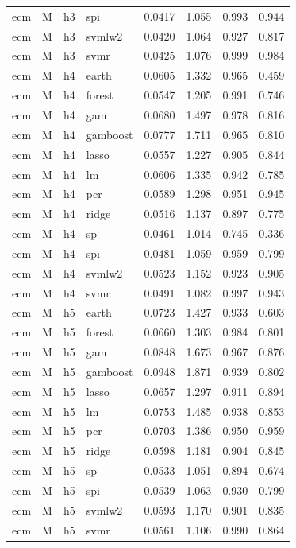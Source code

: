 \begin{ThreePartTable}
\begin{longtable}[t]{llclcccc}
ecm & M & h3 & spi & 0.0417 & 1.055 & 0.993 & 0.944\\
ecm & M & h3 & svmlw2 & 0.0420 & 1.064 & 0.927 & 0.817\\
ecm & M & h3 & svmr & 0.0425 & 1.076 & 0.999 & 0.984\\
\addlinespace
ecm & M & h4 & earth & 0.0605 & 1.332 & 0.965 & 0.459\\
ecm & M & h4 & forest & 0.0547 & 1.205 & 0.991 & 0.746\\
ecm & M & h4 & gam & 0.0680 & 1.497 & 0.978 & 0.816\\
ecm & M & h4 & gamboost & 0.0777 & 1.711 & 0.965 & 0.810\\
ecm & M & h4 & lasso & 0.0557 & 1.227 & 0.905 & 0.844\\
ecm & M & h4 & lm & 0.0606 & 1.335 & 0.942 & 0.785\\
ecm & M & h4 & pcr & 0.0589 & 1.298 & 0.951 & 0.945\\
ecm & M & h4 & ridge & 0.0516 & 1.137 & 0.897 & 0.775\\
ecm & M & h4 & sp & 0.0461 & 1.014 & 0.745 & 0.336\\
ecm & M & h4 & spi & 0.0481 & 1.059 & 0.959 & 0.799\\
ecm & M & h4 & svmlw2 & 0.0523 & 1.152 & 0.923 & 0.905\\
ecm & M & h4 & svmr & 0.0491 & 1.082 & 0.997 & 0.943\\
\addlinespace
ecm & M & h5 & earth & 0.0723 & 1.427 & 0.933 & 0.603\\
ecm & M & h5 & forest & 0.0660 & 1.303 & 0.984 & 0.801\\
ecm & M & h5 & gam & 0.0848 & 1.673 & 0.967 & 0.876\\
ecm & M & h5 & gamboost & 0.0948 & 1.871 & 0.939 & 0.802\\
ecm & M & h5 & lasso & 0.0657 & 1.297 & 0.911 & 0.894\\
ecm & M & h5 & lm & 0.0753 & 1.485 & 0.938 & 0.853\\
ecm & M & h5 & pcr & 0.0703 & 1.386 & 0.950 & 0.959\\
ecm & M & h5 & ridge & 0.0598 & 1.181 & 0.904 & 0.845\\
ecm & M & h5 & sp & 0.0533 & 1.051 & 0.894 & 0.674\\
ecm & M & h5 & spi & 0.0539 & 1.063 & 0.930 & 0.799\\
ecm & M & h5 & svmlw2 & 0.0593 & 1.170 & 0.901 & 0.835\\
ecm & M & h5 & svmr & 0.0561 & 1.106 & 0.990 & 0.864\\

\end{longtable}
\end{ThreePartTable}
